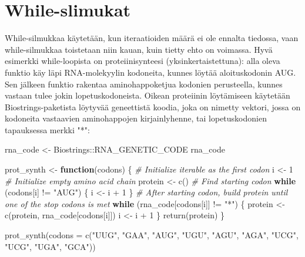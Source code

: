 \documentclass[
]{book}
\newenvironment{Shaded}{\begin{snugshade}}{\end{snugshade}}
\newcommand{\AttributeTok}[1]{\textcolor[rgb]{0.77,0.63,0.00}{#1}}
\newcommand{\CommentTok}[1]{\textcolor[rgb]{0.56,0.35,0.01}{\textit{#1}}}
\newcommand{\ControlFlowTok}[1]{\textcolor[rgb]{0.13,0.29,0.53}{\textbf{#1}}}
\newcommand{\DecValTok}[1]{\textcolor[rgb]{0.00,0.00,0.81}{#1}}
\newcommand{\FunctionTok}[1]{\textcolor[rgb]{0.00,0.00,0.00}{#1}}
\newcommand{\NormalTok}[1]{#1}
\newcommand{\OtherTok}[1]{\textcolor[rgb]{0.56,0.35,0.01}{#1}}
\newcommand{\SpecialCharTok}[1]{\textcolor[rgb]{0.00,0.00,0.00}{#1}}
\newcommand{\StringTok}[1]{\textcolor[rgb]{0.31,0.60,0.02}{#1}}
\begin{document}
\hypertarget{while-slimukat}{%
\section{While-slimukat}\label{while-slimukat}}

While-silmukkaa käytetään, kun iteraatioiden määrä ei ole ennalta tiedossa, vaan while-silmukkaa toistetaan niin kauan, kuin tietty ehto on voimassa. Hyvä esimerkki while-loopista on proteiinisynteesi (yksinkertaistettuna): alla oleva funktio käy läpi RNA-molekyylin kodoneita, kunnes löytää aloituskodonin AUG. Sen jälkeen funktio rakentaa aminohappoketjua kodonien perusteella, kunnes vastaan tulee jokin lopetuskodoneista. Oikean proteiinin löytämiseen käytetään Biostrings-paketista löytyvää geneettistä koodia, joka on nimetty vektori, jossa on kodoneita vastaavien aminohappojen kirjainlyhenne, tai lopetuskodonien tapauksessa merkki "*":

\begin{Shaded}
\begin{Highlighting}[]
\NormalTok{rna\_code }\OtherTok{\textless{}{-}}\NormalTok{ Biostrings}\SpecialCharTok{::}\NormalTok{RNA\_GENETIC\_CODE}
\NormalTok{rna\_code}
\end{Highlighting}
\end{Shaded}

\begin{Shaded}
\begin{Highlighting}[]
\NormalTok{prot\_synth }\OtherTok{\textless{}{-}} \ControlFlowTok{function}\NormalTok{(codons) \{}
  \CommentTok{\# Initialize iterable as the first codon}
\NormalTok{  i }\OtherTok{\textless{}{-}} \DecValTok{1}
  \CommentTok{\# Initialize empty amino acid chain}
\NormalTok{  protein }\OtherTok{\textless{}{-}} \FunctionTok{c}\NormalTok{()}
  \CommentTok{\# Find starting codon}
  \ControlFlowTok{while}\NormalTok{ (codons[i] }\SpecialCharTok{!=} \StringTok{"AUG"}\NormalTok{) \{}
\NormalTok{    i }\OtherTok{\textless{}{-}}\NormalTok{ i }\SpecialCharTok{+} \DecValTok{1}
\NormalTok{  \}}
  \CommentTok{\# After starting codon, build protein until one of the stop codons is met}
  \ControlFlowTok{while}\NormalTok{ (rna\_code[codons[i]] }\SpecialCharTok{!=} \StringTok{"*"}\NormalTok{) \{}
\NormalTok{    protein }\OtherTok{\textless{}{-}} \FunctionTok{c}\NormalTok{(protein, rna\_code[codons[i]])}
\NormalTok{    i }\OtherTok{\textless{}{-}}\NormalTok{ i }\SpecialCharTok{+} \DecValTok{1}
\NormalTok{  \}}
  \FunctionTok{return}\NormalTok{(protein)}
\NormalTok{\}}

\FunctionTok{prot\_synth}\NormalTok{(}\AttributeTok{codons =} \FunctionTok{c}\NormalTok{(}\StringTok{"UUG"}\NormalTok{, }\StringTok{"GAA"}\NormalTok{, }\StringTok{"AUG"}\NormalTok{, }\StringTok{"UGU"}\NormalTok{, }\StringTok{"AGU"}\NormalTok{, }\StringTok{"AGA"}\NormalTok{, }\StringTok{"UCG"}\NormalTok{, }\StringTok{"UCG"}\NormalTok{, }\StringTok{"UGA"}\NormalTok{, }\StringTok{"GCA"}\NormalTok{))}
\end{Highlighting}
\end{Shaded}
\end{document}
